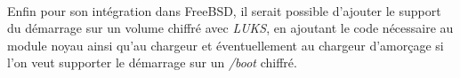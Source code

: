 \paragraph{}
Enfin pour son intégration dans FreeBSD, il serait possible d'ajouter le support
du démarrage sur un volume chiffré avec {\em LUKS}, en ajoutant le code nécessaire
au module noyau ainsi qu'au chargeur et éventuellement au chargeur d'amorçage
si l'on veut supporter le démarrage sur un {\em /boot} chiffré.
